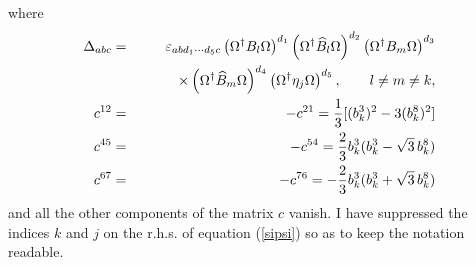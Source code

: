 \documentclass[a4paper,12pt]{article}
\begin{document}
where
\begin{eqnarray*}
\Delta_{abc} &=& \varepsilon_{ab d_1 \cdots d_5 c} \left( \Omega^{\dagger} B_l \Omega \right)^{d_1} \left( \Omega^{\dagger} \widehat{B}_l \Omega \right)^{d_2} \left( \Omega^{\dagger} B_m \Omega \right)^{d_3} \\*
&& \hspace{2.7em} \times \left( \Omega^{\dagger} \widehat{B}_m \Omega \right)^{d_4} \left( \Omega^{\dagger} \eta_j \Omega \right)^{d_5}, \qquad l \neq m \neq k, \\
c^{12} &=& - c^{21} = \frac{1}{3} [(b_k^3)^2 - 3(b_k^8)^2] \\ 
c^{45} &=& - c^{54} = \frac{2}{3} b_k^3 (b_k^3 - \sqrt{3} \, b_k^8) \\
c^{67} &=& - c^{76} = -\frac{2}{3} b_k^3 (b_k^3 + \sqrt{3} \, b_k^8) 
\end{eqnarray*}
and all the other components of the matrix $c$ vanish. I have suppressed the indices $k$ and $j$ on the r.h.s. of equation (\ref{sipsi}) so as to keep the notation readable. 
\end{document}
